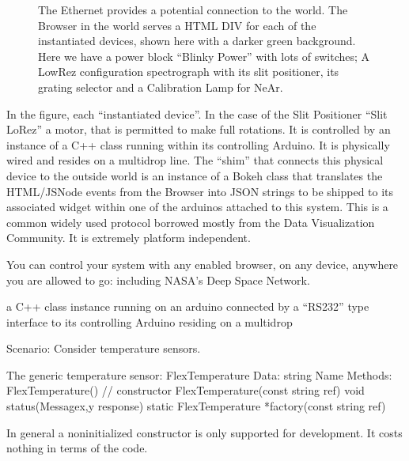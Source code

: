 \documentclass[letterpaper,10pt,english,openany,oneside]{sphinxmanual}
\begin{document}
\begin{figure}[htbp]
\centering
\capstart

\noindent{}
\caption{The Ethernet provides a potential connection to the world. The Browser in the world serves a HTML DIV for each of the instantiated devices, shown here with a darker green background. Here we have a power block “Blinky Power” \textendash{} with lots of switches; A LowRez configuration spectrograph with its slit positioner, its grating selector and a Calibration Lamp for NeAr.}\label{\detokenize{controls:id3}}\end{figure}

\sphinxAtStartPar
In the figure, each “instantiated device”. In the case of the Slit
Positioner “Slit LoRez” a motor, that is permitted to make full
rotations. It is controlled by an instance of a C++ class running
within its controlling Arduino. It is physically wired and resides on
a multi\sphinxhyphen{}drop line. The “shim” that connects this physical device to
the outside world is an instance of a Bokeh class that translates the
HTML/JSNode events from the Browser into JSON strings to be shipped to
its associated widget within one of the arduinos attached to this
system. This is a common widely used protocol \textendash{} borrowed mostly from
the Data Visualization Community. It is extremely platform independent.

\sphinxAtStartPar
You can control your system with any enabled browser, on any device,
anywhere you are allowed to go: including NASA’s Deep Space Network.

\sphinxAtStartPar
a C++ class instance running on an arduino connected by a “RS\sphinxhyphen{}232” type interface to its controlling Arduino residing on a multi\sphinxhyphen{}drop

\sphinxAtStartPar
Scenario: Consider temperature sensors.

\begin{sphinxVerbatim}[commandchars=\\\{\}]
The generic temperature sensor: FlexTemperature
Data: string Name
Methods:
  FlexTemperature() // constructor
  FlexTemperature(const string \PYGZam{}ref)
  void status(Message\PYGZlt{}x,y\PYGZgt{} \PYGZam{}response)
  static FlexTemperature *factory(const string \PYGZam{}ref)
\end{sphinxVerbatim}

\sphinxAtStartPar
In general a non\sphinxhyphen{}initialized constructor is only supported for
development. It costs nothing in terms of the code.
\end{document}
